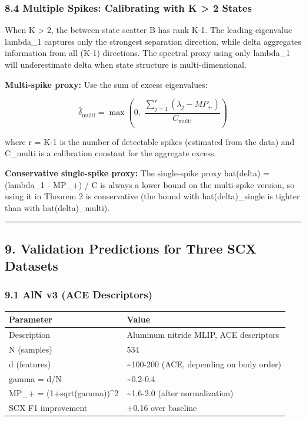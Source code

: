\documentclass[
  12pt,
]{article}
\begin{document}
\subsubsection{8.4 Multiple Spikes: Calibrating with K \textgreater{} 2
States}\label{multiple-spikes-calibrating-with-k-2-states}

When K \textgreater{} 2, the between-state scatter B has rank K-1. The
leading eigenvalue lambda\_1 captures only the strongest separation
direction, while delta aggregates information from all (K-1) directions.
The spectral proxy using only lambda\_1 will underestimate delta when
state structure is multi-dimensional.

\textbf{Multi-spike proxy:} Use the sum of excess eigenvalues:

\[\hat{\delta}_{\text{multi}} = \max\left(0,\; \frac{\sum_{j=1}^r (\lambda_j - MP_+)}{C_{\text{multi}}}\right)\]

where r = K-1 is the number of detectable spikes (estimated from the
data) and C\_multi is a calibration constant for the aggregate excess.

\textbf{Conservative single-spike proxy:} The single-spike proxy
hat(delta) = (lambda\_1 - MP\_+) / C is always a lower bound on the
multi-spike version, so using it in Theorem 2 is conservative (the bound
with hat(delta)\_single is tighter than with hat(delta)\_multi).

\begin{center}\rule{0.5\linewidth}{0.5pt}\end{center}

\subsection{9. Validation Predictions for Three SCX
Datasets}\label{validation-predictions-for-three-scx-datasets}

\subsubsection{9.1 AlN v3 (ACE
Descriptors)}\label{aln-v3-ace-descriptors}

\begin{longtable}[]{@{}ll@{}}
\toprule\noalign{}
Parameter & Value \\
\midrule\noalign{}
\endhead
\bottomrule\noalign{}
\endlastfoot
Description & Aluminum nitride MLIP, ACE descriptors \\
N (samples) & 534 \\
d (features) & \textasciitilde100-200 (ACE, depending on body order) \\
gamma = d/N & \textasciitilde0.2-0.4 \\
MP\_+ = (1+sqrt(gamma))\^{}2 & \textasciitilde1.6-2.0 (after
normalization) \\
SCX F1 improvement & +0.16 over baseline \\
\end{longtable}
\end{document}
